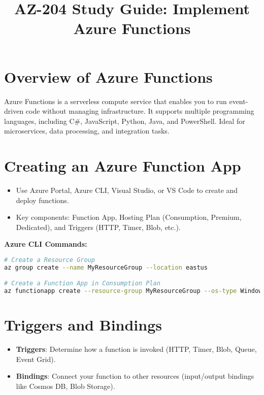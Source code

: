 \documentclass{article}
\title{AZ-204 Study Guide: Implement Azure Functions}
\author{}
\date{}
\begin{document}
\maketitle

\section{Overview of Azure Functions}
Azure Functions is a serverless compute service that enables you to run event-driven code without managing infrastructure. It supports multiple programming languages, including C\#, JavaScript, Python, Java, and PowerShell. Ideal for microservices, data processing, and integration tasks.

\section{Creating an Azure Function App}
\begin{itemize}
    \item Use Azure Portal, Azure CLI, Visual Studio, or VS Code to create and deploy functions.
    \item Key components: Function App, Hosting Plan (Consumption, Premium, Dedicated), and Triggers (HTTP, Timer, Blob, etc.).
\end{itemize}

\textbf{Azure CLI Commands:}
\begin{lstlisting}[language=bash]
# Create a Resource Group
az group create --name MyResourceGroup --location eastus

# Create a Function App in Consumption Plan
az functionapp create --resource-group MyResourceGroup --os-type Windows --consumption-plan-location eastus --runtime dotnet --functions-version 4 --name MyUniqueFunctionAppName --storage-account mystorageaccount
\end{lstlisting}

\section{Triggers and Bindings}
\begin{itemize}
    \item \textbf{Triggers}: Determine how a function is invoked (HTTP, Timer, Blob, Queue, Event Grid).
    \item \textbf{Bindings}: Connect your function to other resources (input/output bindings like Cosmos DB, Blob Storage).
\end{itemize}
\end{document}
